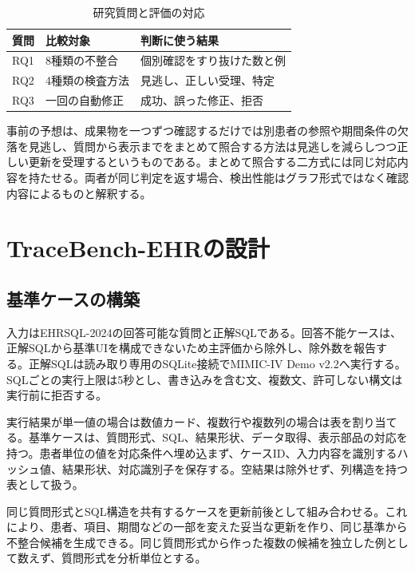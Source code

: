 \documentclass[a4paper]{jsarticle}
\begin{document}
\begin{table}[t]
  \centering
  \setlength{\tabcolsep}{2pt}
  \caption{研究質問と評価の対応}
  \label{tab:rq-mapping}
  \begin{tabular}{C{0.13\columnwidth}L{0.31\columnwidth}L{0.43\columnwidth}}
    \toprule
    質問 & 比較対象 & 判断に使う結果 \\
    \midrule
    RQ1 & 8種類の不整合 & 個別確認をすり抜けた数と例 \\
    RQ2 & 4種類の検査方法 & 見逃し、正しい受理、特定 \\
    RQ3 & 一回の自動修正 & 成功、誤った修正、拒否 \\
    \bottomrule
  \end{tabular}
\end{table}

事前の予想は、成果物を一つずつ確認するだけでは別患者の参照や期間条件の欠落を見逃し、質問から表示までをまとめて照合する方法は見逃しを減らしつつ正しい更新を受理するというものである。まとめて照合する二方式には同じ対応内容を持たせる。両者が同じ判定を返す場合、検出性能はグラフ形式ではなく確認内容によるものと解釈する。

\section{TraceBench-EHRの設計}

\subsection{基準ケースの構築}

入力はEHRSQL-2024の回答可能な質問と正解SQLである。回答不能ケースは、正解SQLから基準UIを構成できないため主評価から除外し、除外数を報告する。正解SQLは読み取り専用のSQLite接続でMIMIC-IV Demo v2.2へ実行する。SQLごとの実行上限は5秒とし、書き込みを含む文、複数文、許可しない構文は実行前に拒否する。

実行結果が単一値の場合は数値カード、複数行や複数列の場合は表を割り当てる。基準ケースは、質問形式、SQL、結果形状、データ取得、表示部品の対応を持つ。患者単位の値を対応条件へ埋め込まず、ケースID、入力内容を識別するハッシュ値、結果形状、対応識別子を保存する。空結果は除外せず、列構造を持つ表として扱う。

同じ質問形式とSQL構造を共有するケースを更新前後として組み合わせる。これにより、患者、項目、期間などの一部を変えた妥当な更新を作り、同じ基準から不整合候補を生成できる。同じ質問形式から作った複数の候補を独立した例として数えず、質問形式を分析単位とする。
\end{document}
